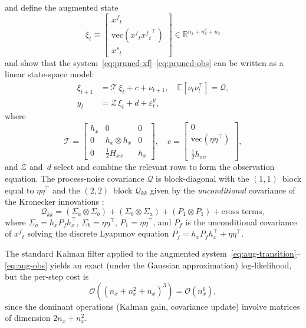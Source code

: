 \documentclass[12pt,a4paper]{article}
\newcommand{\R}{\mathbb{R}}
\newcommand{\E}{\mathbb{E}}
\newcommand{\vect}{\mathrm{vec}}
\newcommand{\kron}{\otimes}
\newcommand{\xf}{{x^{f}}}
\newcommand{\xs}{{x^{s}}}
\newcommand{\hx}{h_x}
\newcommand{\Hxx}{H_{xx}}
\newcommand{\hsig}{{h_{\sigma\sigma}}}
\newcommand{\cO}{\mathcal{O}}
\begin{document}
\citet{andreasen2018pruned} and \citet{kollmann2014tractable} define
the augmented state
\begin{equation}\label{eq:aug-state}
\xi_t \equiv
\begin{bmatrix} \xf_t \\ \vect(\xf_t {\xf_t}^\top) \\ \xs_t
\end{bmatrix}
\in \R^{n_x + n_x^2 + n_x}
\end{equation}
and show that the system~\eqref{eq:pruned-xf}--\eqref{eq:pruned-obs}
can be written as a linear state-space model:
\begin{align}
\xi_{t+1} &= \mathcal{T}\,\xi_t + c + \nu_{t+1},
  \quad \E[\nu_t\nu_t^\top] = \mathcal{Q},
  \label{eq:aug-transition}\\
y_t &= \mathcal{Z}\,\xi_t + d + \varepsilon_t^y,
  \label{eq:aug-obs}
\end{align}
where
\begin{equation}\label{eq:aug-T}
\mathcal{T} =
\begin{bmatrix}
\hx & 0 & 0 \\
0 & \hx \kron \hx & 0 \\
0 & \frac{1}{2}\Hxx & \hx
\end{bmatrix},
\quad
c =
\begin{bmatrix}
0 \\
\vect(\eta\eta^\top) \\
\frac{1}{2}\hsig
\end{bmatrix},
\end{equation}
and $\mathcal{Z}$ and~$d$ select and combine the relevant rows to
form the observation equation. The process-noise covariance
$\mathcal{Q}$ is block-diagonal with the $(1,1)$~block equal to
$\eta\eta^\top$ and the $(2,2)$~block $\mathcal{Q}_{kk}$ given by
the \emph{unconditional} covariance of the Kronecker innovations
\citep[eq.~16]{andreasen2018pruned}:
\begin{equation}\label{eq:Q-kk}
\mathcal{Q}_{kk} =
(\Sigma_a \kron \Sigma_b)
+ (\Sigma_b \kron \Sigma_a)
+ (P_1 \kron P_1)
+ \text{cross terms},
\end{equation}
where $\Sigma_a = \hx P_f \hx^\top$, $\Sigma_b = \eta\eta^\top$,
$P_1 = \eta\eta^\top$, and $P_f$ is the unconditional covariance of
$\xf_t$ solving the discrete Lyapunov equation
$P_f = \hx P_f \hx^\top + \eta\eta^\top$.

The standard Kalman filter applied to the augmented
system~\eqref{eq:aug-transition}--\eqref{eq:aug-obs} yields an
exact (under the Gaussian approximation) log-likelihood, but the
per-step cost is
\begin{equation}\label{eq:aug-cost}
\cO\!\left((n_x + n_x^2 + n_x)^3\right) = \cO(n_x^6),
\end{equation}
since the dominant operations (Kalman gain, covariance update) involve
matrices of dimension $2n_x + n_x^2$.
\end{document}

